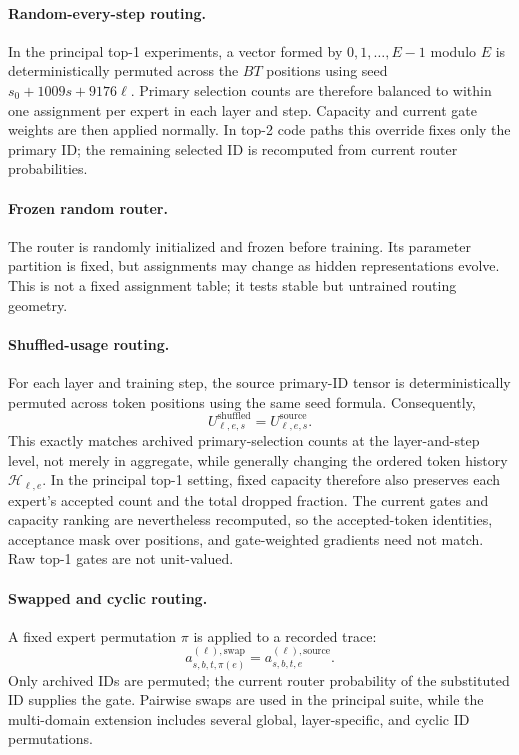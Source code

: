 \documentclass{article}
\begin{document}
\paragraph{Random-every-step routing.}
In the principal top-1 experiments, a vector formed by
$0,1,\ldots,E-1$ modulo $E$ is deterministically permuted across the $BT$
positions using seed $s_0+1009s+9176\ell$. Primary selection counts are
therefore balanced to within one assignment per expert in each layer and step.
Capacity and current gate weights are then applied normally. In top-2 code paths
this override fixes only the primary ID; the remaining selected ID is recomputed
from current router probabilities.

\paragraph{Frozen random router.}
The router is randomly initialized and frozen before training. Its parameter
partition is fixed, but assignments may change as hidden representations
evolve. This is not a fixed assignment table; it tests stable but untrained
routing geometry.

\paragraph{Shuffled-usage routing.}
For each layer and training step, the source primary-ID tensor is deterministically
permuted across token positions using the same seed formula. Consequently,
\begin{equation}
U_{\ell,e,s}^{\mathrm{shuffled}}
=
U_{\ell,e,s}^{\mathrm{source}}.
\label{eq:app_shuffled_usage}
\end{equation}
This exactly matches archived primary-selection counts at the layer-and-step
level, not merely in aggregate, while generally changing the ordered token
history $\mathcal H_{\ell,e}$. In the principal top-1 setting, fixed capacity
therefore also preserves each expert's accepted count and the total dropped
fraction. The current gates and capacity ranking are nevertheless recomputed,
so the accepted-token identities, acceptance mask over positions, and
gate-weighted gradients need not match. Raw top-1 gates are not unit-valued.

\paragraph{Swapped and cyclic routing.}
A fixed expert permutation $\pi$ is applied to a recorded trace:
\begin{equation}
a_{s,b,t,\pi(e)}^{(\ell),\mathrm{swap}}
=
a_{s,b,t,e}^{(\ell),\mathrm{source}}.
\label{eq:app_swap}
\end{equation}
Only archived IDs are permuted; the current router probability of the substituted
ID supplies the gate. Pairwise swaps are used in the principal suite, while the
multi-domain extension includes several global, layer-specific, and cyclic ID
permutations.
\end{document}
